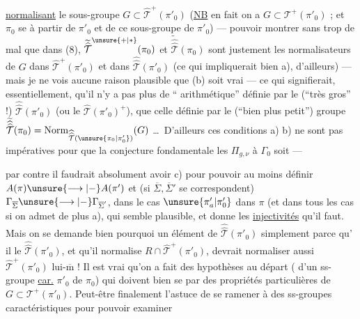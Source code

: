 \uline{normalisant} le sous-groupe $G\subset\widehat{\mathcal T}^{+}(\pi'_0)$
(\uline{NB} en fait on a $G\subset\mathcal T^{+}(\pi'_0)$ ;  et $\pi_0$
se  à partir de $\pi'_0$ et de
ce sous-groupe de $\pi'_0$) --- 
pouvoir montrer sans trop de mal
que  dans (8), $\widetilde{\widehat{\mathcal T}}^{\unsure{+|\ast}}(\pi_0)$ et $\widetilde{\widehat{\widehat{\mathcal T}}}(\pi_0)$
sont justement les normalisateurs de $G$
dans $\widehat{\mathcal T}^{+}(\pi'_0)$ et dans $\widehat{\widehat{\mathcal T}}(\pi'_0)$ (ce
qui impliquerait bien a), d'ailleurs) ---
mais je ne vois aucune raison plausible
que (b) soit vrai --- ce qui signifierait,
essentiellement, qu'il n'y a pas plus de
`` arithmétique'' définie par le
(``très gros'' !) $\widehat{\widehat{\mathcal T}}(\pi'_0)$ (ou le $\widehat{\mathcal T}(\pi'_0)^{+}$), que
celle définie par le (``bien plus petit'') groupe
$\widetilde{\widehat{\widehat{\mathcal T}}}(\pi_0)=\operatorname{Norm}_{\widehat{\widehat{\mathcal T}}(\unsure{\pi_0|\pi'_0})}(G)$ \dots\ D'ailleurs ces
conditions a) b) ne sont pas impératives
pour que la conjecture fondamentale
 les $\Pi_{g,\nu}$ à $\Gamma_0$ soit  ---

par contre il faudrait absolument avoir
c) pour pouvoir au moins définir
$A(\pi)\unsure{\longrightarrow|{-}}A(\pi')$ et (si $\overline\Sigma,\overline\Sigma'$ se correspondent)
$\Gamma_{\overline\Sigma}\unsure{\longrightarrow|{-}}\Gamma_{\overline\Sigma'}$, dans le cas $\unsure{\pi'_a|\pi'_0}$  dans $\pi$
(et dans tous les cas si on admet de plus
a), qui semble  plausible, et donne
les \uline{injectivités} qu'il faut. Mais on
se demande bien pourquoi un élément
de  $\widehat{\widehat{\mathcal T}}(\pi'_0)$ simplement parce qu'
il  le 
 $\widehat{\widehat{\mathcal T}}(\pi'_0)$,  et qu'il normalise
$R\cap\widehat{\mathcal T}^{+}(\pi'_0)$, devrait normaliser aussi
$\widehat{\mathcal T}^{+}(\pi'_0)$ lui-$\overline{\mathrm m}$ ! Il est vrai qu'on a
fait des hypothèses  au départ
( d'un ss-groupe \uline{car.} $\pi'_0$ de $\pi_0$) qui
doivent bien se  par des propriétés
particulières de $G\subset\mathcal T^{+}(\pi'_0)$. Peut-être
finalement l'astuce de se ramener à des
ss-groupes caractéristiques pour pouvoir examiner

